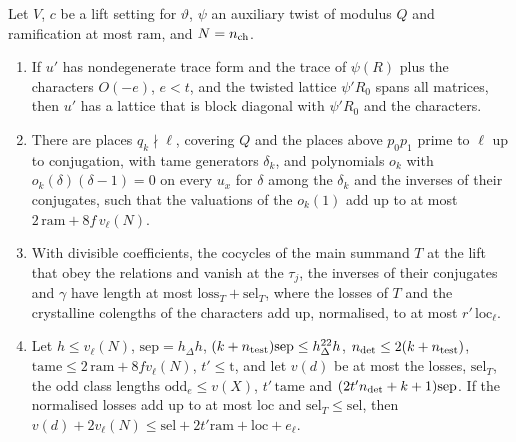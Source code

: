 \begin{lemma}\label{lem:ribet-inputs}
Let $V$, $c$ be a lift setting for $\vartheta$, $\psi$ an auxiliary twist of modulus $Q$ and ramification at most $\mathrm{ram}$, and $N=n_{\rm ch}$.
\begin{enumerate}[label=\textup{(\alph*)}]
\item If $u'$ has nondegenerate trace form and the trace of $\psi(R)$ plus the characters $O(-e)$, $e<t$, and the twisted lattice $\psi'R_0$ spans all matrices, then $u'$ has a lattice that is block diagonal with $\psi'R_0$ and the characters.
\item There are places $q_k\nmid\ell$, covering $Q$ and the places above $p_0p_1$ prime to $\ell$ up to conjugation, with tame generators $\delta_k$, and polynomials $o_k$ with $o_k(\delta)(\delta-1)=0$ on every $u_x$ for $\delta$ among the $\delta_k$ and the inverses of their
conjugates, such that the valuations of the $o_k(1)$ add up to at most $2\,\mathrm{ram}+8f\,v_\ell(N)$.
\item With divisible coefficients, the cocycles of the main summand $T$ at the lift that obey the relations and vanish at the $\tau_j$, the inverses of their conjugates and $\gamma$ have length at most $\mathrm{loss}_T+\mathrm{sel}_T$, where the losses of $T$ and the
crystalline colengths of the characters add up, normalised, to at most $r'\,\mathrm{loc}_\ell$.
\item Let $h\le v_\ell(N)$, $\mathrm{sep}=h_\Delta h$, $(k+n_{\rm test})\mathrm{sep}\le h_\Delta^{22}h$, $n_{\rm det}\le2(k+n_{\rm test})$, $\mathrm{tame}\le2\,\mathrm{ram}+8fv_\ell(N)$, $t'\le\mathrm t$, and let $v(d)$ be at most the losses, $\mathrm{sel}_T$, the odd class lengths $\mathrm{odd}_e\le v(X)$, $t'\,\mathrm{tame}$ and
$(2t'n_{\rm det}+k+1)\mathrm{sep}$. If the normalised losses add up to at most $\mathrm{loc}$ and $\mathrm{sel}_T\le\mathrm{sel}$, then $v(d)+2v_\ell(N)\le\mathrm{sel}+2t'\mathrm{ram}+\mathrm{loc}+e_\ell$.
\end{enumerate}
\end{lemma}

